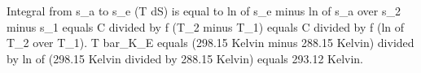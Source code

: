 Integral from s_a to s_e (T dS) is equal to ln of s_e minus ln of s_a over s_2 minus s_1 equals C divided by f (T_2 minus T_1) equals C divided by f (ln of T_2 over T_1).  
T bar_K_E equals (298.15 Kelvin minus 288.15 Kelvin) divided by ln of (298.15 Kelvin divided by 288.15 Kelvin) equals 293.12 Kelvin.